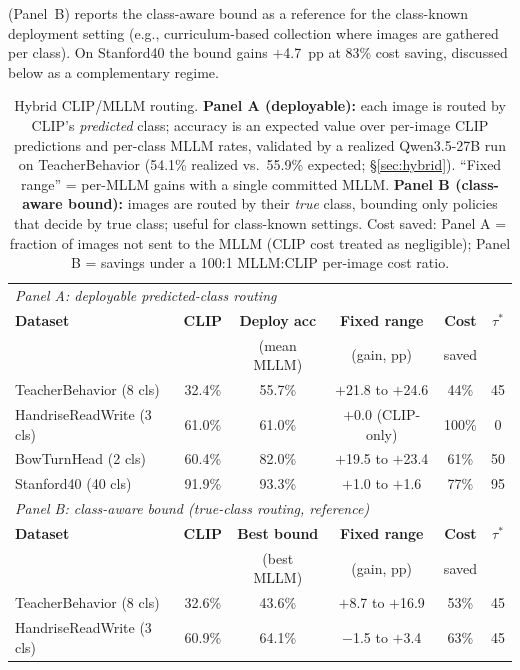 \documentclass[11pt,a4paper]{article}
\begin{document}
 (Panel~B) reports the class-aware bound as a reference for the class-known deployment setting (e.g., curriculum-based collection where images are gathered per class). On Stanford40 the bound gains $+$4.7~pp at 83\% cost saving, discussed below as a complementary regime.

\begin{table}[t]
\caption{Hybrid CLIP/MLLM routing. \textbf{Panel A (deployable):} each image is routed by CLIP's \emph{predicted} class; accuracy is an expected value over per-image CLIP predictions and per-class MLLM rates, validated by a realized Qwen3.5-27B run on TeacherBehavior (54.1\% realized vs.\ 55.9\% expected; \S\ref{sec:hybrid}). ``Fixed range'' = per-MLLM gains with a single committed MLLM. \textbf{Panel B (class-aware bound):} images are routed by their \emph{true} class, bounding only policies that decide by true class; useful for class-known settings. Cost saved: Panel A = fraction of images not sent to the MLLM (CLIP cost treated as negligible); Panel B = savings under a 100:1 MLLM:CLIP per-image cost ratio.}
\label{tab:hybrid}
\centering
\footnotesize
\setlength{\tabcolsep}{2.5pt}
\begin{tabular}{lccccc}
\toprule
\multicolumn{6}{l}{\textit{Panel A: deployable predicted-class routing}} \\
\textbf{Dataset} & \textbf{CLIP} & \textbf{Deploy acc} & \textbf{Fixed range} & \textbf{Cost} & $\tau^*$ \\
 & & (mean MLLM) & (gain, pp) & saved & \\
\midrule
TeacherBehavior (8 cls) & 32.4\% & 55.7\% & $+$21.8 to $+$24.6 & 44\% & 45 \\
HandriseReadWrite (3 cls) & 61.0\% & 61.0\% & $+$0.0 (CLIP-only) & 100\% & 0 \\
BowTurnHead (2 cls) & 60.4\% & 82.0\% & $+$19.5 to $+$23.4 & 61\% & 50 \\
Stanford40 (40 cls) & 91.9\% & 93.3\% & $+$1.0 to $+$1.6 & 77\% & 95 \\
\midrule
\multicolumn{6}{l}{\textit{Panel B: class-aware bound (true-class routing, reference)}} \\
\textbf{Dataset} & \textbf{CLIP} & \textbf{Best bound} & \textbf{Fixed range} & \textbf{Cost} & $\tau^*$ \\
 & & (best MLLM) & (gain, pp) & saved & \\
\midrule
TeacherBehavior (8 cls) & 32.6\% & 43.6\% & $+$8.7 to $+$16.9 & 53\% & 45 \\
HandriseReadWrite (3 cls) & 60.9\% & 64.1\% & $-$1.5 to $+$3.4 & 63\% & 45 \\

\end{tabular}
\end{table}
\end{document}
